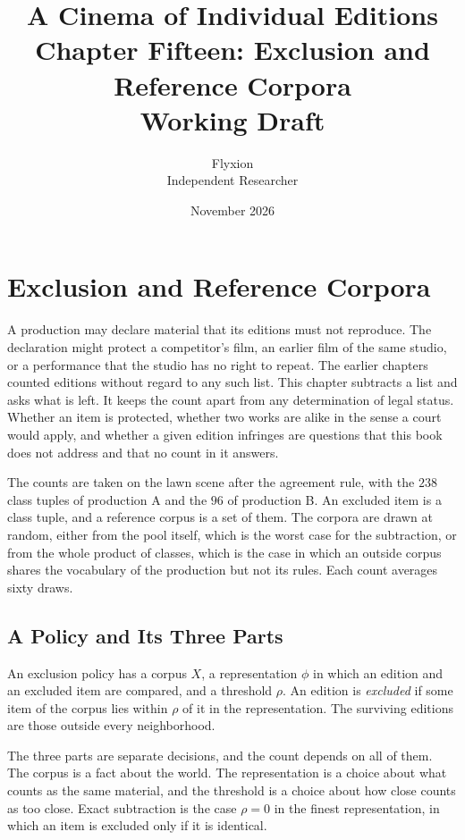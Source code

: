 \documentclass[11pt,twoside,openright]{book}
\title{\Huge\bfseries A Cinema of Individual Editions\\[1.2ex]
\large Chapter Fifteen: Exclusion and Reference Corpora\\[0.4ex]
\large Working Draft}
\author{Flyxion\\[0.3ex]\small Independent Researcher}
\date{November 2026}
\theoremstyle{plain}
\theoremstyle{definition}
\theoremstyle{remark}
\begin{document}
\frontmatter
\maketitle
\tableofcontents
\mainmatter
\setcounter{chapter}{14}

\chapter{Exclusion and Reference Corpora}
\label{ch:exclusion}

A production may declare material that its editions must not reproduce. The declaration might protect a competitor's film, an earlier film of the same studio, or a performance that the studio has no right to repeat. The earlier chapters counted editions without regard to any such list. This chapter subtracts a list and asks what is left. It keeps the count apart from any determination of legal status. Whether an item is protected, whether two works are alike in the sense a court would apply, and whether a given edition infringes are questions that this book does not address and that no count in it answers.

The counts are taken on the lawn scene after the agreement rule, with the $238$ class tuples of production A and the $96$ of production B. An excluded item is a class tuple, and a reference corpus is a set of them. The corpora are drawn at random, either from the pool itself, which is the worst case for the subtraction, or from the whole product of classes, which is the case in which an outside corpus shares the vocabulary of the production but not its rules. Each count averages sixty draws.

\section{A Policy and Its Three Parts}\label{sec:policy15}

An exclusion policy has a corpus $X$, a representation $\phi$ in which an edition and an excluded item are compared, and a threshold $\rho$. An edition is \emph{excluded} if some item of the corpus lies within $\rho$ of it in the representation. The surviving editions are those outside every neighborhood.

The three parts are separate decisions, and the count depends on all of them. The corpus is a fact about the world. The representation is a choice about what counts as the same material, and the threshold is a choice about how close counts as too close. Exact subtraction is the case $\rho=0$ in the finest representation, in which an item is excluded only if it is identical.
\end{document}
